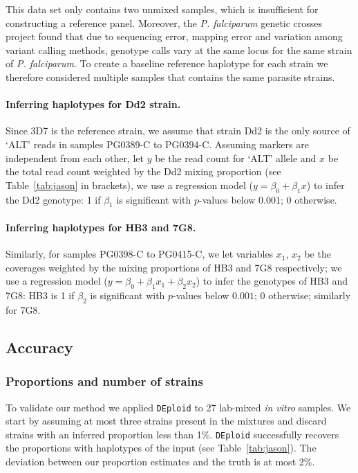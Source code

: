 \documentclass{bioinfo}
\begin{document}
This data set only contains two unmixed samples, which is insufficient for constructing a reference panel. Moreover, the {\em P. falciparum} genetic crosses project \citep{Miles2016} found that due to sequencing error, mapping error and variation among variant calling methods, genotype calls vary at the same locus for the same strain of {\it P. falciparum}. To create a baseline reference haplotype for each strain we therefore considered multiple samples that contains the same parasite strains.


\paragraph{Inferring haplotypes for Dd2 strain.}
Since 3D7 is the reference strain, we assume that strain Dd2 is the only source of `ALT' reads in samples {\textmd PG0389-C} to {\textmd PG0394-C}. Assuming markers are independent from each other, let $y$ be the read count for `ALT' allele and $x$ be the total read count weighted by the Dd2 mixing proportion (see Table~\ref{tab:jason} in brackets), we use a regression model ($y = \beta_0 + \beta_{1} x$) to infer the Dd2 genotype: 1 if $\beta_{1}$ is significant with $p$-values below $0.001$; 0 otherwise.


\paragraph{Inferring haplotypes for HB3 and 7G8.}
Similarly, for samples {\textmd PG0398-C} to {\textmd PG0415-C}, we let variables $x_1$, $x_2$ be the coverages weighted by the mixing proportions of HB3 and 7G8 respectively; we use a regression model ($y = \beta_0 + \beta_{1} x_1 + \beta_{2} x_2$) to infer the genotypes of HB3 and 7G8: HB3 is 1 if $\beta_{2}$ is significant with $p$-values below $0.001$; 0 otherwise; similarly for 7G8.


\subsection{Accuracy}

\subsubsection{Proportions and number of strains}

To validate our method we applied \texttt{DEploid} to 27 lab-mixed {\it in vitro} samples. We start by assuming at most three strains present in the mixtures and discard strains with an inferred proportion less than 1\%. \texttt{DEploid} successfully recovers the proportions with haplotypes of the input (see Table~\ref{tab:jason}). The deviation between our proportion estimates and the truth is at most 2\%.
\end{document}
